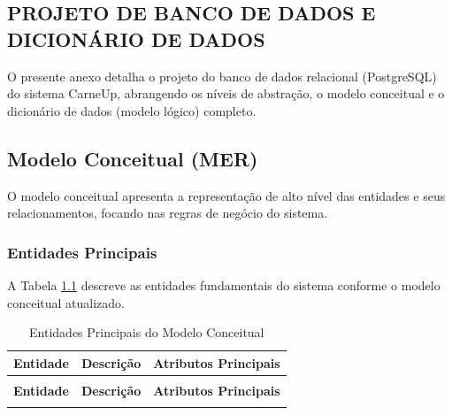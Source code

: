 \documentclass[
	12pt,				%
	openany,			%
	oneside,			%
	a4paper,			%
	english,			%
	french,				%
	spanish,			%
	brazil				%
	]{abntex2}
\begin{document}
\begin{apendicesenv}

\chapter{PROJETO DE BANCO DE DADOS E DICIONÁRIO DE DADOS}
\label{apendice:banco_dados}

O presente anexo detalha o projeto do banco de dados relacional (PostgreSQL) do sistema CarneUp, abrangendo os níveis de abstração, o modelo conceitual e o dicionário de dados (modelo lógico) completo.

\section{Modelo Conceitual (MER)}

O modelo conceitual apresenta a representação de alto nível das entidades e seus relacionamentos, focando nas regras de negócio do sistema.

\subsection{Entidades Principais}

A Tabela \ref{tab:entidades_principais} descreve as entidades fundamentais do sistema conforme o modelo conceitual atualizado.

\begin{longtable}{|>{\raggedright\arraybackslash}m{4cm}|>{\raggedright\arraybackslash}m{5cm}|>{\raggedright\arraybackslash}m{6cm}|}
    \caption{Entidades Principais do Modelo Conceitual}
    \label{tab:entidades_principais}\\
    \hline
    \textbf{Entidade} & \textbf{Descrição} & \textbf{Atributos Principais} \\
    \hline
    \endfirsthead
    \multicolumn{3}{c}{{\bfseries \tablename\ \thetable{} -- continuação}} \\
    \hline
    \textbf{Entidade} & \textbf{Descrição} & \textbf{Atributos Principais} \\
    \hline
    \endhead
    \hline
    \endfoot
    \hline
    \endlastfoot


\end{longtable}
\end{apendicesenv}
\end{document}

